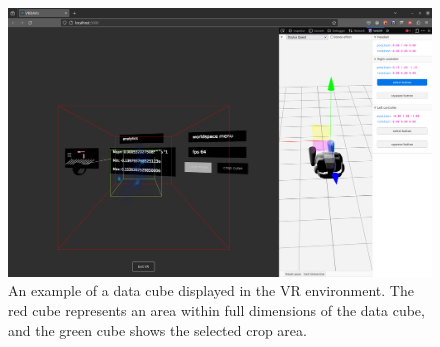 \begin{figure}
    \centering
    \includegraphics[width=\linewidth]{figures/screenshots/10.png}
    \caption{An example of a data cube displayed in the VR environment. The red cube represents an area within full dimensions of the data cube, and the green cube shows the selected crop area.}
    \label{fig:screenshot-10}
\end{figure}